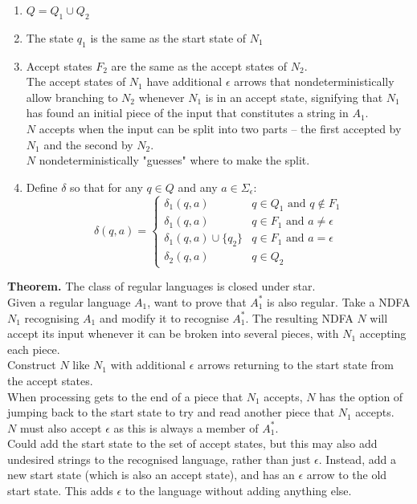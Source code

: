 \documentclass{article}
\begin{document}
\begin{enumerate}
	\item $Q = Q_1 \cup Q_2$
	\item The state $q_1$ is the same as the start state of $N_1$
	\item Accept states $F_2$ are the same as the accept states of $N_2$.
	\\ The accept states of $N_1$ have additional $\epsilon$ arrows that nondeterministically allow branching to $N_2$ whenever $N_1$ is in an accept state, signifying that $N_1$ has found an initial piece of the input that constitutes a string in $A_1$.
	\\ $N$ accepts when the input can be split into two parts -- the first accepted by $N_1$ and the second by $N_2$.
	\\ $N$ nondeterministically "guesses" where to make the split.
	\item Define $\delta$ so that for any $q \in Q$ and any $a \in \Sigma_{\epsilon}$:
	\begin{equation*}
		\delta(q, a) = \begin{cases}
		\delta_1(q, a) & q \in Q_1 \text{ and } q \notin F_1\\
		\delta_1(q, a) & q \in F_1 \text{ and } a \neq \epsilon\\
		\delta_1(q, a) \cup \{q_2\} & q \in F_1 \text{ and } a = \epsilon\\
		\delta_2(q, a) & q \in Q_2 
		\end{cases}
	\end{equation*}
\end{enumerate}
\textbf{Theorem.} The class of regular languages is closed under star.\medskip
\\ Given a regular language $A_1$, want to prove that $A_1^*$ is also regular. Take a NDFA $N_1$ recognising $A_1$ and modify it to recognise $A_1^*$. The resulting NDFA $N$ will accept its input whenever it can be broken into several pieces, with $N_1$ accepting each piece.\medskip
\\ Construct $N$ like $N_1$ with additional $\epsilon$ arrows returning to the start state from the accept states.
\\ When processing gets to the end of a piece that $N_1$ accepts, $N$ has the option of jumping back to the start state to try and read another piece that $N_1$ accepts.
\\ $N$ must also accept $\epsilon$ as this is always a member of $A_1^*$.\medskip
\\ Could add the start state to the set of accept states, but this may also add undesired strings to the recognised language, rather than just $\epsilon$. Instead, add a new start state (which is also an accept state), and has an $\epsilon$ arrow to the old start state. This adds $\epsilon$ to the language without adding anything else.\medskip
\end{document}
